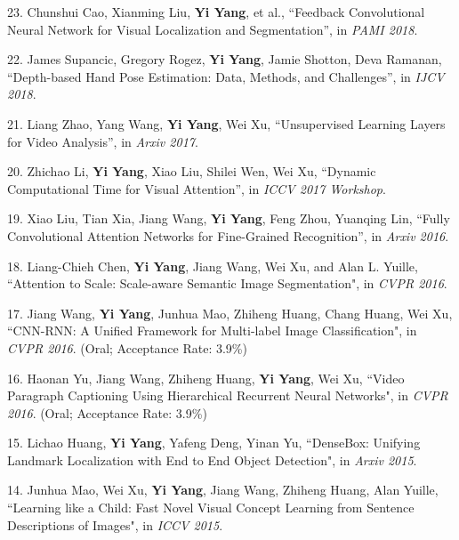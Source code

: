 \documentclass[margin]{res3}
\newenvironment{list1}{
  \begin{list}{\ding{113}}{%
      \setlength{\itemsep}{0.03in}
      \setlength{\parsep}{0in} \setlength{\parskip}{0in}
      \setlength{\topsep}{0in} \setlength{\partopsep}{0in}
      \setlength{\leftmargin}{0in}}}{\end{list}}
\begin{document}
\begin{resume}
\begin{list1}
\item[] 23. Chunshui Cao, Xianming Liu, {\bf Yi Yang}, et al.,
``Feedback Convolutional Neural Network for Visual Localization and Segmentation'',
in \textit{PAMI 2018}.

\item[] 22. James Supancic, Gregory Rogez, {\bf Yi Yang}, Jamie Shotton, Deva Ramanan,
``Depth-based Hand Pose Estimation: Data, Methods, and Challenges'',
in \textit{IJCV 2018}.

\item[] 21. Liang Zhao, Yang Wang, {\bf Yi Yang}, Wei Xu,
``Unsupervised Learning Layers for Video Analysis'',
in \textit{Arxiv 2017}.

\item[] 20. Zhichao Li, {\bf Yi Yang}, Xiao Liu, Shilei Wen, Wei Xu,
``Dynamic Computational Time for Visual Attention'',
in \textit{ICCV 2017 Workshop}.

\item[] 19. Xiao Liu, Tian Xia, Jiang Wang, {\bf Yi Yang}, Feng Zhou, Yuanqing Lin,
``Fully Convolutional Attention Networks for Fine-Grained Recognition'',
in \textit{Arxiv 2016}.

\item[] 18. Liang-Chieh Chen, {\bf Yi Yang}, Jiang Wang, Wei Xu, and Alan L. Yuille, 
``Attention to Scale: Scale-aware Semantic Image Segmentation",
in \textit{CVPR 2016}.

\item[] 17. Jiang Wang, {\bf Yi Yang}, Junhua Mao, Zhiheng Huang, Chang Huang, Wei Xu, 
``CNN-RNN: A Unified Framework for Multi-label Image Classification",
in \textit{CVPR 2016}. (Oral; Acceptance Rate: 3.9\%)

\item[] 16. Haonan Yu, Jiang Wang, Zhiheng Huang, {\bf Yi Yang}, Wei Xu, 
``Video Paragraph Captioning Using Hierarchical Recurrent Neural Networks",
in \textit{CVPR 2016}. (Oral; Acceptance Rate: 3.9\%)

\item[] 15. Lichao Huang, {\bf Yi Yang}, Yafeng Deng, Yinan Yu, 
``DenseBox: Unifying Landmark Localization with End to End Object Detection",
in \textit{Arxiv 2015}.

\item[] 14. Junhua Mao, Wei Xu, {\bf Yi Yang}, Jiang Wang, Zhiheng Huang, Alan Yuille,
``Learning like a Child: Fast Novel Visual Concept Learning from Sentence Descriptions of Images",
in \textit{ICCV 2015}.


\end{list1}
\end{resume}
\end{document}
